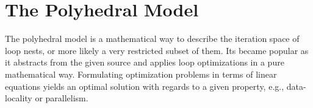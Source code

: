\clearpage
\section{The Polyhedral Model}
The polyhedral model is a mathematical way to describe the iteration space of 
loop nests, or more likely a very restricted subset of them.
Its became popular as it abstracts from the given source and applies loop
optimizations in a pure mathematical way. Formulating optimization problems 
in terms of linear equations yields an optimal solution with regards to a given
property, e.g., data-locality or parallelism.




  


